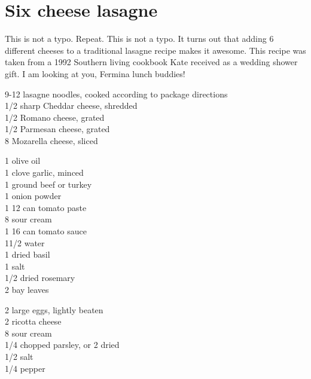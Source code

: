 \section{Six cheese lasagne}

\begin{open}
This is not a typo. Repeat. This is not a typo. It turns out that adding 6 different cheeses to a traditional lasagne recipe makes it awesome. This recipe was taken from a 1992 Southern living cookbook Kate received as a wedding shower gift. I am looking at you, Fermina lunch buddies!\\
\end{open}

\begin{ingredients}
9-12 lasagne noodles, cooked according to package directions\\
\SI{1/2}{\cup} sharp Cheddar cheese, shredded\\
\SI{1/2}{\cup} Romano cheese, grated\\
\SI{1/2}{\cup} Parmesan cheese, grated \\
\SI{8}{\ounce} Mozarella cheese, sliced \\
\end{ingredients}

\begin{ingredients}
    \SI{1}{\tblspoon} olive oil\\
    1 clove garlic, minced\\
    \SI{1}{\ounce} ground beef or turkey \\
    \SI{1}{\teaspoon} onion powder\\
    1 \SI{12}{\ounce} can tomato paste\\
    \SI{8}{\ounce} sour cream\\
    1 \SI{16}{\ounce} can tomato sauce\\
    1\SI{1/2}{\cup} water\\
    \SI{1}{\tblspoon} dried basil\\
    \SI{1}{\teaspoon} salt\\
    \SI{1/2}{\teaspoon} dried rosemary\\
    2 bay leaves\\
\end{ingredients}

\begin{ingredients}
    2 large eggs, lightly beaten\\
    \SI{2}{\cup} ricotta cheese\\
    \SI{8}{\ounce} sour cream \\
    \SI{1/4}{\cup} chopped parsley, or \SI{2}{\tblspoon} dried\\
    \SI{1/2}{\teaspoon} salt\\
    \SI{1/4}{\teaspoon} pepper\\
\end{ingredients}

